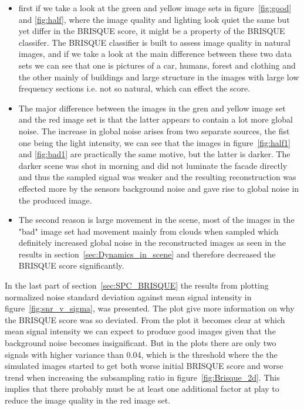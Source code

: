 \begin{itemize}
\item first if we take a look at the green and yellow image sets in figure~\ref{fig:good} and \ref{fig:half}, where the image quality and lighting look quiet the same but yet differ in the BRISQUE score, it might be a property of the BRISQUE classifer. The BRISQUE classifier is built to assess image quality in natural images, and if we take a look at the main difference between these two data sets we can see that one is pictures of a car, humans, forest and clothing and the other mainly of buildings and large structure in the images with large low frequency sections i.e. not so natural, which can effect the score.

\item The major difference between the images in the gren and yellow image set and the red image set is that the latter appears to contain a lot more global noise. The increase in global noise arises from two separate sources, the fist one being the light intensity, we can see that the images in figure~\ref{fig:half1} and \ref{fig:bad1} are practically the same motive, but the latter is darker. The darker scene was shot in morning and did not luminate the facade directly and thus the sampled signal was weaker and the resulting reconstruction was effected more by the sensors background noise and gave rise to global noise in the produced image. 

\item The second reason is large movement in the scene, most of the images in the "bad" image set had movement mainly from clouds when sampled which definitely increased global noise in the reconstructed images as seen in the results in section~\ref{sec:Dynamics_in_scene} and therefore decreased the BRISQUE score significantly.

\end{itemize}

In the last part of section~\ref{sec:SPC_BRISQUE} the results from plotting normalized noise standard deviation against mean signal intensity in figure~\ref{fig:snr_v_sigma}, was presented. The plot give more information on why the BRISQUE score was so deviated. From the plot it becomes clear at which mean signal intensity we can expect to produce good images given that the background noise becomes insignificant. But in the plots there are only two signals with higher variance than 0.04, which is the threshold where the the simulated images started to get both worse initial BRISQUE score and worse trend when increasing the subsampling ratio in figure~\ref{fig:Brisque_2d}. This implies that there probably must be at least one additional factor at play to reduce the image quality in the red image set.\\[0.1in]



